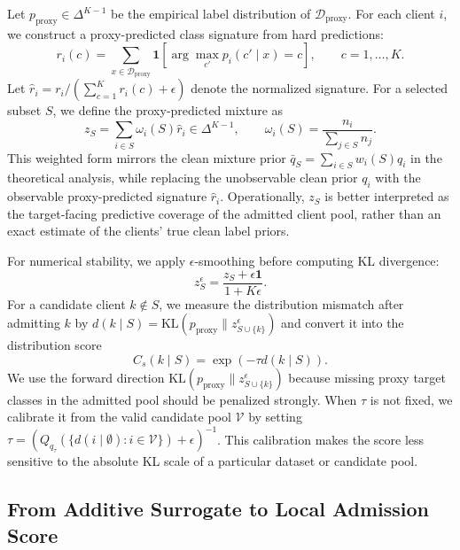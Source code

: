 \documentclass[conference]{IEEEtran}
\theoremstyle{definition}
\theoremstyle{remark}
\begin{document}
Let $p_{\mathrm{proxy}}\in\Delta^{K-1}$ be the empirical label distribution of $\mathcal D_{\mathrm{proxy}}$.
For each client $i$, we construct a proxy-predicted class signature from hard predictions:
\begin{equation}
\label{eq:predictive_signature_main}
r_i(c)
=
\sum_{x\in\mathcal D_{\mathrm{proxy}}}
\mathbf{1}
\left[
\arg\max_{c'}p_i(c'\mid x)=c
\right],
\qquad c=1,\dots,K.
\end{equation}
Let $\hat r_i=r_i/(\sum_{c=1}^{K}r_i(c)+\epsilon)$ denote the normalized signature.
For a selected subset $S$, we define the proxy-predicted mixture as
\begin{equation}
\label{eq:subset_signature_main}
z_S
=
\sum_{i\in S}
\omega_i(S)\hat r_i
\in\Delta^{K-1},
\qquad
\omega_i(S)=\frac{n_i}{\sum_{j\in S}n_j}.
\end{equation}
This weighted form mirrors the clean mixture prior $\bar q_S=\sum_{i\in S}w_i(S)q_i$ in the theoretical analysis, while replacing the unobservable clean prior $q_i$ with the observable proxy-predicted signature $\hat r_i$.
Operationally, $z_S$ is better interpreted as the target-facing predictive coverage of the admitted client pool, rather than an exact estimate of the clients' true clean label priors.

For numerical stability, we apply $\epsilon$-smoothing before computing KL divergence:
\[
z_S^\epsilon=\frac{z_S+\epsilon\mathbf 1}{1+K\epsilon}.
\]
For a candidate client $k\notin S$, we measure the distribution mismatch after admitting $k$ by $d(k\mid S)=\mathrm{KL}(p_{\mathrm{proxy}}\|z_{S\cup\{k\}}^\epsilon)$ and convert it into the distribution score
\begin{equation}
\label{eq:distribution_score}
C_s(k\mid S)
=
\exp\!\left(-\tau d(k\mid S)\right).
\end{equation}
We use the forward direction $\mathrm{KL}(p_{\mathrm{proxy}}\|z_{S\cup\{k\}}^\epsilon)$ because missing proxy target classes in the admitted pool should be penalized strongly.
When $\tau$ is not fixed, we calibrate it from the valid candidate pool $\mathcal V$ by setting $\tau=(Q_{q_\tau}(\{d(i\mid\emptyset):i\in\mathcal V\})+\epsilon)^{-1}$.
This calibration makes the score less sensitive to the absolute KL scale of a particular dataset or candidate pool.

\subsection{From Additive Surrogate to Local Admission Score}
\label{subsec:local_admission_score}
\end{document}
